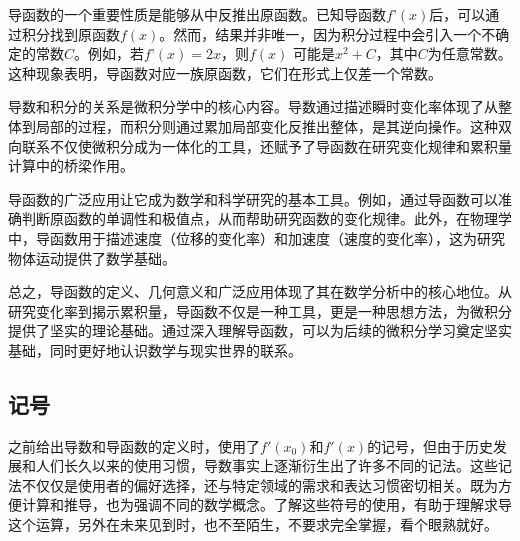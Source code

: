 导函数的一个重要性质是能够从中反推出原函数。已知导函数$f’(x)$后，可以通过积分找到原函数$f(x)$。然而，结果并非唯一，因为积分过程中会引入一个不确定的常数$C$。例如，若$f’(x) = 2x$，则$f(x)$ 可能是$x^2 + C$，其中$C$为任意常数。这种现象表明，导函数对应一族原函数，它们在形式上仅差一个常数。

导数和积分的关系是微积分学中的核心内容。导数通过描述瞬时变化率体现了从整体到局部的过程，而积分则通过累加局部变化反推出整体，是其逆向操作。这种双向联系不仅使微积分成为一体化的工具，还赋予了导函数在研究变化规律和累积量计算中的桥梁作用。

导函数的广泛应用让它成为数学和科学研究的基本工具。例如，通过导函数可以准确判断原函数的单调性和极值点，从而帮助研究函数的变化规律。此外，在物理学中，导函数用于描述速度（位移的变化率）和加速度（速度的变化率），这为研究物体运动提供了数学基础。

总之，导函数的定义、几何意义和广泛应用体现了其在数学分析中的核心地位。从研究变化率到揭示累积量，导函数不仅是一种工具，更是一种思想方法，为微积分提供了坚实的理论基础。通过深入理解导函数，可以为后续的微积分学习奠定坚实基础，同时更好地认识数学与现实世界的联系。



\subsection{记号}

之前给出导数和导函数的定义时，使用了$f'(x_0)$和$f'(x)$的记号，但由于历史发展和人们长久以来的使用习惯，导数事实上逐渐衍生出了许多不同的记法。这些记法不仅仅是使用者的偏好选择，还与特定领域的需求和表达习惯密切相关。既为方便计算和推导，也为强调不同的数学概念。了解这些符号的使用，有助于理解求导这个运算，另外在未来见到时，也不至陌生，不要求完全掌握，看个眼熟就好。

